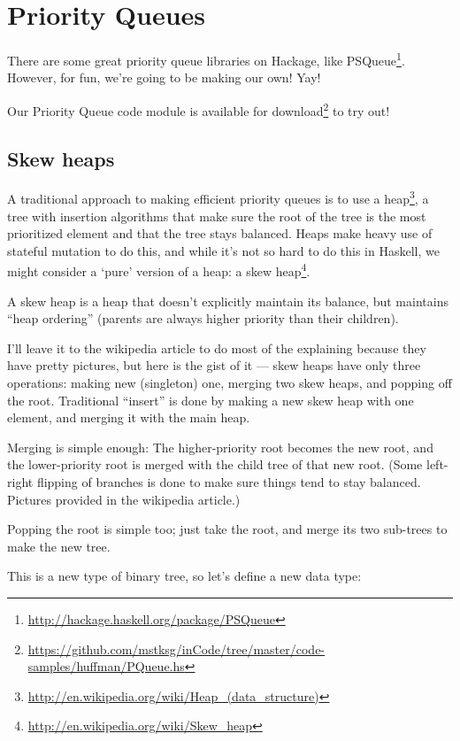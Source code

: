 \documentclass[]{article}
\renewcommand{\href}[2]{#2\footnote{\url{#1}}}
\begin{document}
\hypertarget{priority-queues}{%
\section{Priority Queues}\label{priority-queues}}

There are some great priority queue libraries on Hackage, like
\href{http://hackage.haskell.org/package/PSQueue}{PSQueue}. However, for fun,
we're going to be making our own! Yay!

Our Priority Queue code module is
\href{https://github.com/mstksg/inCode/tree/master/code-samples/huffman/PQueue.hs}{available
for download} to try out!

\hypertarget{skew-heaps}{%
\subsection{Skew heaps}\label{skew-heaps}}

A traditional approach to making efficient priority queues is to use a
\href{http://en.wikipedia.org/wiki/Heap_(data_structure)}{heap}, a tree with
insertion algorithms that make sure the root of the tree is the most prioritized
element and that the tree stays balanced. Heaps make heavy use of stateful
mutation to do this, and while it's not so hard to do this in Haskell, we might
consider a `pure' version of a heap: a
\href{http://en.wikipedia.org/wiki/Skew_heap}{skew heap}.

A skew heap is a heap that doesn't explicitly maintain its balance, but
maintains ``heap ordering'' (parents are always higher priority than their
children).

I'll leave it to the wikipedia article to do most of the explaining because they
have pretty pictures, but here is the gist of it --- skew heaps have only three
operations: making new (singleton) one, merging two skew heaps, and popping off
the root. Traditional ``insert'' is done by making a new skew heap with one
element, and merging it with the main heap.

Merging is simple enough: The higher-priority root becomes the new root, and the
lower-priority root is merged with the child tree of that new root. (Some
left-right flipping of branches is done to make sure things tend to stay
balanced. Pictures provided in the wikipedia article.)

Popping the root is simple too; just take the root, and merge its two sub-trees
to make the new tree.

This is a new type of binary tree, so let's define a new data type:
\end{document}
